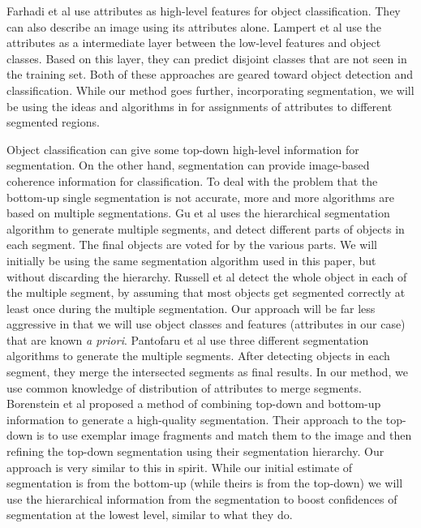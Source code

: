 \documentclass[10pt,twocolumn,letterpaper]{article}
\begin{document}
Farhadi et al
\cite{farhadi09} use attributes as high-level features for object classification. They
can also describe an image using its attributes alone.
Lampert et al \cite{lampert09}
use the attributes as a intermediate layer between the low-level
features and object classes. Based on this layer, they can predict
disjoint classes that are not seen in the training set.  Both of these
approaches are geared toward object detection and classification.  While
our method goes further, incorporating segmentation, we will be using
the ideas and algorithms in \cite{farhadi09} for assignments of
attributes to different segmented regions.

Object classification can give some top-down high-level information
for segmentation. On the other hand, segmentation can provide
image-based coherence information for classification. To deal with
the problem that the bottom-up single segmentation is not accurate,
more and more algorithms are based on multiple segmentations. Gu et
al \cite{gu09} uses the hierarchical segmentation algorithm to
generate multiple segments, and detect different parts of objects in
each segment. The final objects are voted for by the various parts.
We will initially be using the same segmentation algorithm used in
this paper, but without discarding the hierarchy.
Russell et al \cite{russell06} detect the whole object in each of
the multiple segment, by assuming that most objects get segmented
correctly at least once during the multiple segmentation. Our approach
will be far less aggressive in that we will use object classes and
features (attributes in our case) that are known \emph{a priori}.
Pantofaru et
al \cite{pantofaru} use three different segmentation algorithms to
generate the multiple segments. After detecting objects in each
segment, they merge the intersected segments as final results. In
our method, we use common knowledge of distribution of attributes to
merge segments.
Borenstein et al \cite{borenstein04} proposed a method of combining top-down
and bottom-up information to generate a high-quality segmentation.  Their
approach to the top-down is to use exemplar image fragments and match them
to the image and then refining the top-down segmentation using their
segmentation hierarchy.  Our approach is very similar to this in spirit.
While our initial estimate of segmentation is from the bottom-up (while
theirs is from the top-down) we will use the hierarchical information
from the segmentation to boost confidences of segmentation at the lowest
level, similar to what they do.
\end{document}
